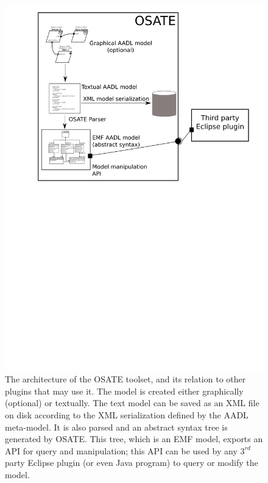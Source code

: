 \begin{figure}
\centering
\includegraphics[scale=0.9]{figs/osate_arch}
\caption[OSATE open-source AADL toolset.]{The architecture of the
  OSATE toolset, and its relation to other plugins that may use
  it. The model is created either graphically (optional) or
  textually. The text model can be saved as an XML file on disk
  according to the XML serialization defined by the AADL
  meta-model. It is also parsed and an abstract syntax tree is
  generated by OSATE. This tree, which is an EMF model, exports an API
  for query and manipulation; this API can be used by any $3^{rd}$
  party Eclipse plugin (or even Java program) to query or modify the
  model.}
\label{fig:osate_arch}
\end{figure}

